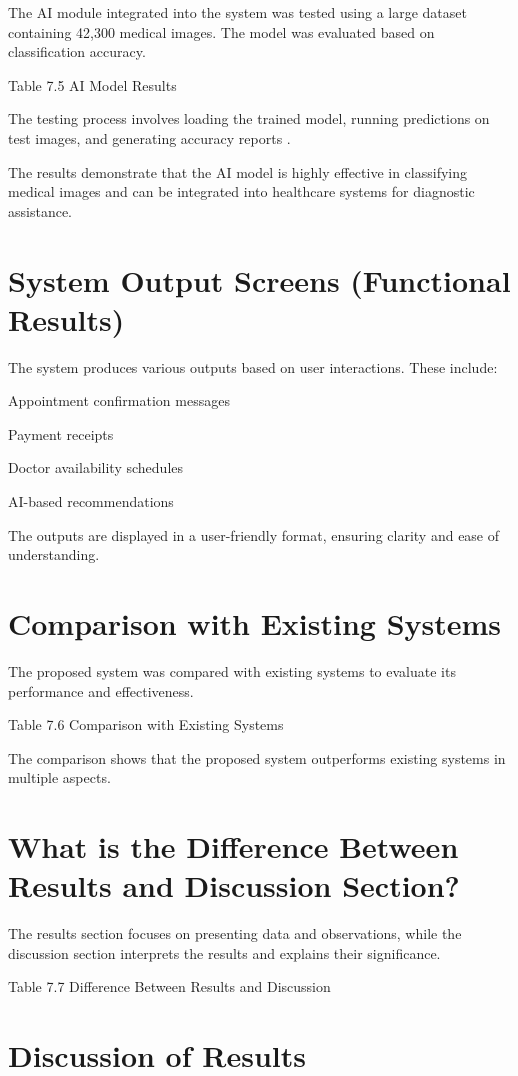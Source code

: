 The AI module integrated into the system was tested using a large dataset containing 42,300 medical images. The model was evaluated based on classification accuracy.

Table 7.5 AI Model Results

The testing process involves loading the trained model, running predictions on test images, and generating accuracy reports .

The results demonstrate that the AI model is highly effective in classifying medical images and can be integrated into healthcare systems for diagnostic assistance.

\section{System Output Screens (Functional Results)}

The system produces various outputs based on user interactions. These include:

Appointment confirmation messages

Payment receipts

Doctor availability schedules

AI-based recommendations

The outputs are displayed in a user-friendly format, ensuring clarity and ease of understanding.

\section{Comparison with Existing Systems}

The proposed system was compared with existing systems to evaluate its performance and effectiveness.

Table 7.6 Comparison with Existing Systems

The comparison shows that the proposed system outperforms existing systems in multiple aspects.

\section{What is the Difference Between Results and Discussion Section?}

The results section focuses on presenting data and observations, while the discussion section interprets the results and explains their significance.

Table 7.7 Difference Between Results and Discussion

\section{Discussion of Results}

